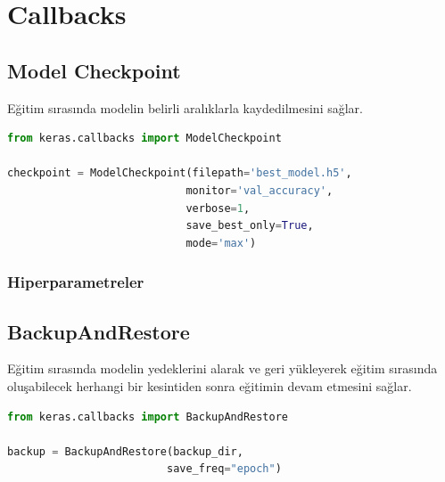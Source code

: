 \section{Callbacks}

\subsection{Model Checkpoint}
Eğitim sırasında modelin belirli aralıklarla kaydedilmesini sağlar.

\begin{lstlisting}[language=Python]
from keras.callbacks import ModelCheckpoint

checkpoint = ModelCheckpoint(filepath='best_model.h5',
							monitor='val_accuracy',
							verbose=1,
							save_best_only=True,
							mode='max')
\end{lstlisting}

\subsubsection{Hiperparametreler}
\begin{table}[h]
\centering
{\scriptsize\renewcommand{\arraystretch}{0.4}
{}}
\end{table}

\subsection{BackupAndRestore}
Eğitim sırasında modelin yedeklerini alarak ve geri yükleyerek eğitim sırasında oluşabilecek herhangi bir kesintiden sonra eğitimin devam etmesini sağlar.

\begin{lstlisting}[language=Python]
from keras.callbacks import BackupAndRestore

backup = BackupAndRestore(backup_dir,
						 save_freq="epoch")
\end{lstlisting}

